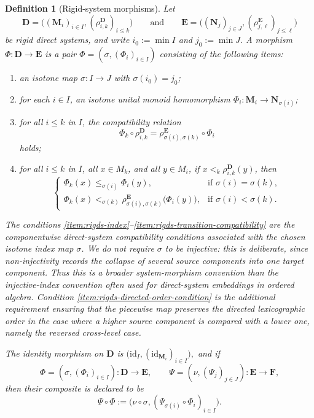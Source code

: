\documentclass[pdflatex,sn-mathphys-num]{sn-jnl}
\makeatletter
\theoremstyle{thmstyleone}%
\theoremstyle{thmstyletwo}%
\theoremstyle{thmstylethree}%
\newtheorem{definition}[theorem]{Definition}
\newcommand{\taggeditem}[2]{%
 \item[#1]%
 \def\@currentlabel{#1}%
 \label{#2}%
}
\makeatother
\begin{document}
\begin{definition}[Rigid-system morphisms]\label{def:rigid-direct-system-morphism}
Let
\[
\mathbf D=\bigl((\mathbf M_i)_{i\in I},(\rho^{\mathbf D}_{i,k})_{i\le k}\bigr)
\qquad\text{and}\qquad
\mathbf E=\bigl((\mathbf N_j)_{j\in J},(\rho^{\mathbf E}_{j,\ell})_{j\le \ell}\bigr)
\]
be rigid direct systems, and write \(i_0:=\min I\) and \(j_0:=\min J\).
A \emph{morphism} \(\Phi\colon \mathbf D\to \mathbf E \) is a pair \(\Phi=(\sigma,(\Phi_i)_{i\in I})\) consisting of the following items:
\begin{enumerate}
\taggeditem{\textup{(DS1)}}{item:rigds-index}
an isotone map \(\sigma\colon I\to J\) with \(\sigma(i_0)=j_0\);

\taggeditem{\textup{(DS2)}}{item:rigds-components}
for each \(i\in I\), an isotone unital monoid homomorphism \(\Phi_i\colon \mathbf M_i\to \mathbf N_{\sigma(i)}\);

\taggeditem{\textup{(DS3)}}{item:rigds-transition-compatibility}
for all \(i\le k\) in \(I\), the compatibility relation
\[
\Phi_k\circ \rho^{\mathbf D}_{i,k}
=
\rho^{\mathbf E}_{\sigma(i),\sigma(k)}\circ \Phi_i
\]
holds;

\taggeditem{\textup{(Ord)}}{item:rigds-directed-order-condition}
for all \(i\le k\) in \(I\), all \(x\in M_k\), and all \(y\in M_i\), if \(x <_k \rho^{\mathbf D}_{i,k}(y)\), then
\[
\begin{cases}
\Phi_k(x)\le_{\sigma(i)} \Phi_i(y), & \text{if }\sigma(i)=\sigma(k),\\[1mm]
\Phi_k(x)<_{\sigma(k)}
\rho^{\mathbf E}_{\sigma(i),\sigma(k)}\!\bigl(\Phi_i(y)\bigr),
& \text{if }\sigma(i)<\sigma(k).
\end{cases}
\]
\end{enumerate}
The conditions \ref{item:rigds-index}--\ref{item:rigds-transition-compatibility} are the componentwise direct-system compatibility conditions associated with the chosen isotone index map \(\sigma\).
We do not require \(\sigma\) to be injective: this is deliberate, since non-injectivity records the collapse of several source components into one target component.
Thus this is a broader system-morphism convention than the injective-index convention often used for direct-system embeddings in ordered algebra.
Condition \ref{item:rigds-directed-order-condition} is the additional requirement ensuring that the piecewise map preserves the directed lexicographic order in the case where a higher source component is compared with a lower one, namely the reversed cross-level case.

The identity morphism on \(\mathbf D\) is \(\bigl(\mathrm{id}_I,(\mathrm{id}_{\mathbf M_i})_{i\in I}\bigr), \) and if
\[
\Phi=(\sigma,(\Phi_i)_{i\in I})\colon \mathbf D\to \mathbf E,
\qquad
\Psi=(\nu,(\Psi_j)_{j\in J})\colon \mathbf E\to \mathbf F,
\]
then their composite is declared to be
\[
\Psi\circ \Phi
:=
\bigl(\nu\circ\sigma,(\Psi_{\sigma(i)}\circ \Phi_i)_{i\in I}\bigr).
\]
\end{definition}
\end{document}
